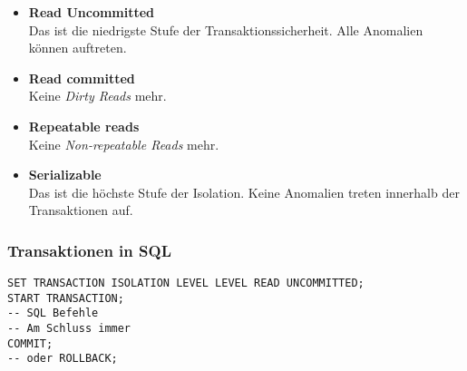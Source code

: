 \begin{itemize}
  \item \textbf{Read Uncommitted} \\
  Das ist die niedrigste Stufe der Transaktionssicherheit.  Alle Anomalien können auftreten.
  \item \textbf{Read committed} \\
  Keine \emph{Dirty Reads} mehr. 
  \item \textbf{Repeatable reads} \\
  Keine \emph{Non-repeatable Reads} mehr. 
  \item \textbf{Serializable} \\
  Das ist die höchste Stufe der Isolation. Keine Anomalien treten innerhalb der Transaktionen auf.
\end{itemize}

\subsubsection{Transaktionen in SQL}

\begin{lstlisting}[caption={Transaktionen in SQL}]
SET TRANSACTION ISOLATION LEVEL LEVEL READ UNCOMMITTED;
START TRANSACTION;
-- SQL Befehle
-- Am Schluss immer
COMMIT;
-- oder ROLLBACK;
\end{lstlisting}

